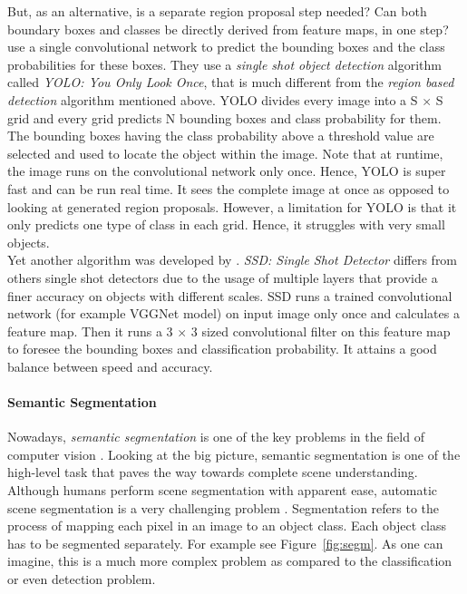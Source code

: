 \documentclass[12pt,a4paper,table,dvipsnames,tikz]{report}
\newcommand{\term}{\textit}
\newcommand{\acronym}{\MakeUppercase}
\newcommand{\bl}[1]{{\hypersetup{linkcolor=blue}#1}}
\begin{document}
	But, as an alternative, is a separate region proposal step needed? Can both boundary 
	boxes and classes be directly derived from feature maps, in one step? \citet{Redmon} use a single 
	convolutional network to predict the bounding boxes and the class probabilities for 
	these boxes. They use a \term{single shot object detection} algorithm called 
	\term{\acronym{yolo}: You Only Look Once}, that is much different from the 
	\term{region based detection} algorithm mentioned above. \acronym{yolo} divides every 
	image into a S $\times$ S grid and every grid predicts N bounding boxes and class 
	probability for them. The bounding boxes having the class probability above a threshold 
	value are selected and used to locate the object within the image. Note that at runtime, 
	the image runs on the convolutional network only once. Hence, \acronym{yolo} is super 
	fast and can be run real time. It sees the complete image at once as opposed to looking 
	at generated region proposals. However, a limitation for \acronym{yolo} is that it only 
	predicts one type of class in each grid. Hence, it struggles with very small objects.
	\\
	
	Yet another algorithm was developed by \citet{Liu}. \term{\acronym{ssd}: Single Shot 
	Detector} differs from others single shot detectors due to the usage of multiple layers 
	that provide a finer accuracy on objects with different scales. \acronym{ssd} runs a 
	trained convolutional network (for example VGGNet model) on input image only once and 
	calculates a feature map. Then it runs a 3 $\times$ 3 sized convolutional filter on 
	this feature map to foresee the bounding boxes and classification probability. It 
	attains a good balance between speed and accuracy.
	\\
	
	\paragraph{Semantic Segmentation}
	\label{sec:bg:data:neural:models:s}
	
	Nowadays, \term{semantic segmentation} is one of the key problems in the field of 
	computer vision \citep{Le}. Looking at the big picture, semantic segmentation is one 
	of the high-level task that paves the way towards complete scene understanding. 
	Although humans perform scene segmentation with apparent ease, automatic scene 
	segmentation is a very challenging problem \citep{Wang}. Segmentation refers to the 
	process of mapping each pixel in an image to an object class. Each object class has 
	to be segmented separately. For example see Figure~\bl{\ref{fig:segm}}. As one can imagine, 
	this is a much more complex problem as compared to the classification or even detection 
	problem. 
	\\
	
\end{document}
